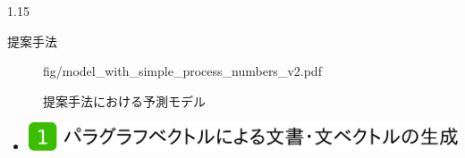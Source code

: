 \documentclass[unicode,10pt]{beamer}
\newlength{\mycolumnwidth}
\newlength{\mytitlefigureheight}
\newcommand{\itemtitle}[1]{\textbf{#1}\\}
\newcommand{\fire}[1]{\textcolor{red}{\textbf{#1}}}
\begin{document}
\begin{frame}[t]
\begin{columns}[onlytextwidth,t]
\begin{column}{1.15\mycolumnwidth}
\begin{block}{提案手法}
\begin{figure}
                      {fig/model_with_simple_process_numbers_v2.pdf}
      \caption*{提案手法における予測モデル}
    \end{figure}
    \vspace{-0.75em} %
    \begin{itemize}
      \item \itemtitle{\includegraphics[height=\mytitlefigureheight]
                                       {fig/poster_model_title_1.pdf}}
    \end{itemize}


\end{block}
\end{column}
\end{columns}
\end{frame}
\end{document}
